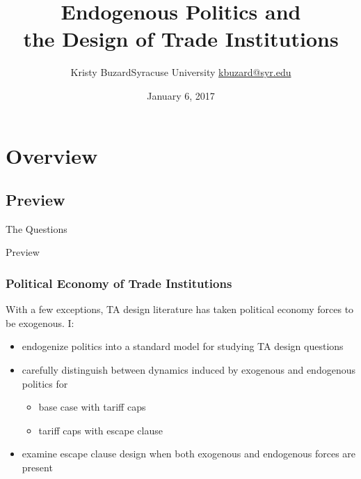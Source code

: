 \documentclass[handout]{beamer}
\title[Endogenous Politics and the Design of Trade Institutions\hspace{2.05in}\insertframenumber/\inserttotalframenumber]{Endogenous Politics and \\ the Design of Trade Institutions}
\author[Kristy Buzard]{\texorpdfstring{Kristy Buzard\newline Syracuse University \newline\url{kbuzard@syr.edu}}{Kristy Buzard}}
\date{January 6, 2017}
\begin{document}
\maketitle




\section{Overview}
\subsection{Preview}
\begin{frame}{The Questions}

\pause
{}

\end{frame}


\begin{frame}{Preview}
\frametitle{Political Economy of Trade Institutions}
\pause
With a few exceptions, TA design literature has taken political economy forces to be exogenous. I:
\pause
\begin{itemize}[<+->]
	\item endogenize politics into a standard model for studying TA design questions
	\item carefully distinguish between dynamics induced by exogenous and endogenous politics for
		\begin{itemize}[<+->]
			\item base case with tariff caps
			\item tariff caps with escape clause
		\end{itemize}
	\item examine escape clause design when both exogenous and endogenous forces are present
\end{itemize}
\end{frame}
\end{document}
